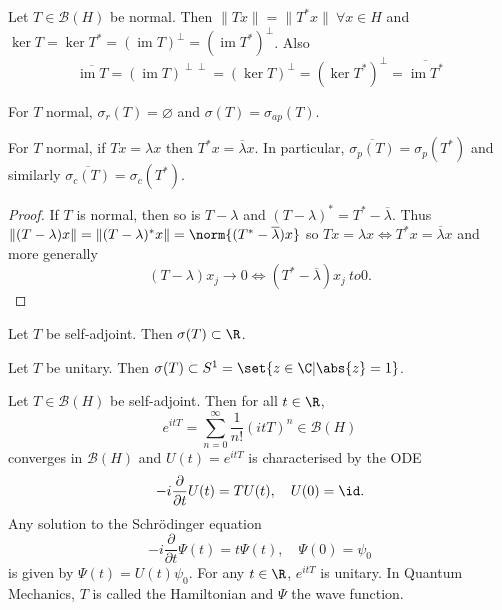 \documentclass{article}
\renewcommand{\emptyset}{\varnothing}
\DeclareMathOperator{\im}{im}
\begin{document}

\begin{ex}
    Let $T \in \mathcal{B}(H)$ be normal.
    Then $\|Tx\| = \|T^* x\| \ \forall x \in H$ and $\ker T = \ker T^* = (\im T)^\perp = (\im T^*)^\perp$.
    Also
    \begin{equation*}
        \overline{\im T} = (\im T)^{\perp \perp} = (\ker T)^\perp = (\ker T^*)^\perp = \overline{\im T^*}
    \end{equation*}
\end{ex}

\begin{cor}
    For $T$ normal, $\sigma_r(T) = \emptyset$ and $\sigma(T) = \sigma_{ap}(T)$.
\end{cor}

\begin{cor}
    For $T$ normal, if $Tx = \lambda x$ then $T^* x = \overline{\lambda} x$.
    In particular, $\overline{\sigma_p(T)} = \sigma_p(T^*)$ and similarly $\overline{\sigma_c(T)} = \sigma_c(T^*)$.
\end{cor}

\begin{proof}
    If $T$ is normal, then so is $T - \lambda$ and $(T-\lambda)^* = T^* - \overline{\lambda}$.
    Thus $\|(T-\lambda)x\| = \|(T-\lambda)^* x\| = \norm{(T^* - \overline{\lambda}) x}$ so $Tx = \lambda x \iff T^* x = \overline{\lambda} x$ and more generally
    \begin{equation*}
        (T - \lambda) x_j \to 0 \iff (T^* - \overline{\lambda}) x_j \ to 0.
    \end{equation*}
\end{proof}

\begin{cor}
    Let $T$ be self-adjoint. Then $\sigma(T) \subset \R$.
\end{cor}

\begin{ex}
    Let $T$ be unitary. Then $\sigma(T) \subset S^1 = \set{z \in \C | \abs{z} = 1}$.
\end{ex}

\begin{eg}
    Let $T \in \mathcal{B}(H)$ be self-adjoint. Then for all $t \in \R$,
    \begin{equation*}
        e^{itT} = \sum_{n=0}^\infty \frac{1}{n!} (itT)^n \in \mathcal{B}(H)
    \end{equation*}
    converges in $\mathcal{B}(H)$ and $U(t) = e^{itT}$ is characterised by the ODE
    \begin{equation*}
        -i \frac{\partial}{\partial t} U(t) = T U(t), \quad U(0) = \id.
    \end{equation*}
    Any solution to the Schr\"odinger equation
    \begin{equation*}
        -i \frac{\partial}{\partial t} \Psi(t) = t \Psi(t), \quad \Psi(0) = \psi_0
    \end{equation*}
    is given by $\Psi(t) = U(t) \psi_0$. For any $t \in \R$, $e^{itT}$ is unitary.
    In Quantum Mechanics, $T$ is called the Hamiltonian and $\Psi$ the wave function.
\end{eg}
\end{document}

